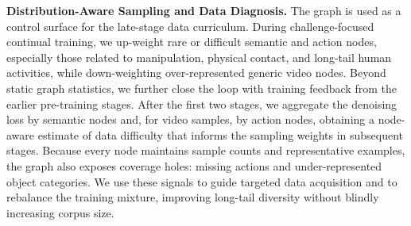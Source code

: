 \noindent\textbf{Distribution-Aware Sampling and Data Diagnosis.}
The graph is used as a control surface for the late-stage data curriculum.
During challenge-focused continual training, we up-weight rare or difficult semantic and action nodes, especially those related to manipulation, physical contact, and long-tail human activities, while down-weighting over-represented generic video nodes.
Beyond static graph statistics, we further close the loop with training feedback from the earlier pre-training stages.
After the first two stages, we aggregate the denoising loss by semantic nodes and, for video samples, by action nodes, obtaining a node-aware estimate of data difficulty that informs the sampling weights in subsequent stages.
Because every node maintains sample counts and representative examples, the graph also exposes coverage holes: missing actions and under-represented object categories.
We use these signals to guide targeted data acquisition and to rebalance the training mixture, improving long-tail diversity without blindly increasing corpus size.

